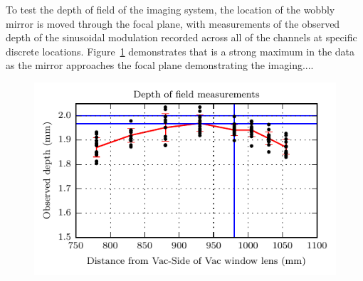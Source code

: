 To test the depth of field of the imaging system, the location of the wobbly mirror is moved through the focal plane, with measurements of the observed depth of the sinusoidal modulation recorded across all of the channels at specific discrete locations.
Figure~\ref{fig:depth_of_field} demonstrates that is a strong maximum in the data as the mirror approaches the focal plane demonstrating the imaging....
\begin{figure}[!h]
\begin{center}
\includegraphics[]{figures/depth_of_field.pdf}
\end{center}
\caption{}
\label{fig:depth_of_field}
\end{figure}

